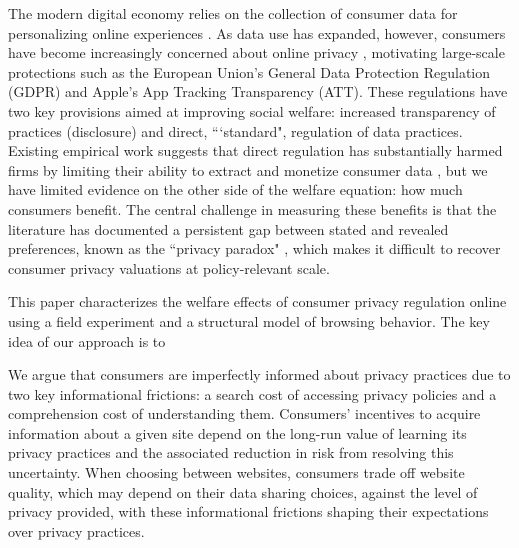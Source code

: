 \documentclass[12pt]{article}
\theoremstyle{definition}
\theoremstyle{remark}
\begin{document}
The modern digital economy relies on the collection of consumer data for personalizing online experiences \citep{goldfarb2019digital, farronato2025data}. As data use has expanded, however, consumers have become increasingly concerned about online privacy \citep{goldfarb2012shifts}, motivating large-scale protections such as the European Union's General Data Protection Regulation (GDPR) and Apple’s App Tracking Transparency (ATT). These regulations have two key provisions aimed at improving social welfare: increased transparency of practices (disclosure) and direct, ```standard", regulation of data practices. Existing empirical work suggests that direct regulation has substantially harmed firms by limiting their ability to extract and monetize consumer data \citep{johnson2020consumer, goldberg2023regulating, aridor2023effect, aridor2024privacy}, but we have limited evidence on the other side of the welfare equation: how much consumers benefit. The central challenge in measuring these benefits is that the literature has documented a persistent gap between stated and revealed preferences, known as the ``privacy paradox" \citep{acquisti2016economics, athey2025digital}, which makes it difficult to recover consumer privacy valuations at policy-relevant scale.

This paper characterizes the welfare effects of consumer privacy regulation online using a field experiment and a structural model of browsing behavior. The key idea of our approach is to 

We argue that consumers are imperfectly informed about privacy practices due to two key informational frictions: a search cost of accessing privacy policies and a comprehension cost of understanding them. Consumers' incentives to acquire information about a given site depend on the long-run value of learning its privacy practices and the associated reduction in risk from resolving this uncertainty. When choosing between websites, consumers trade off website quality, which may depend on their data sharing choices, against the level of privacy provided, with these informational frictions shaping their expectations over privacy practices.
\end{document}
